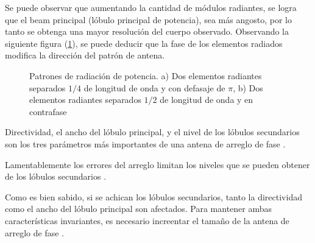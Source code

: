 Se puede observar que aumentando la cantidad de módulos radiantes, se logra que el beam principal (lóbulo principal de 
potencia), sea más angosto, por lo tanto se obtenga una mayor resolución del cuerpo observado. Observando la siguiente 
figura (\ref{fig:directArrayPat}), se puede deducir que la fase de los elementos radiados modifica la dirección del 
patrón de antena.

\begin{figure}[H]
	\centering
	\caption{Patrones de radiación de potencia. a) Dos elementos radiantes separados $1/4$ de longitud de onda y con 
		defasaje de $\pi$, b) Dos elementos radiantes separados $1/2$ de longitud de onda y en contrafase}
	\label{fig:directArrayPat}
\end{figure}

Directividad, el ancho del lóbulo principal, y el nivel de los lóbulos secundarios son los tres parámetros más importantes 
de una antena de arreglo de fase \cite{Hsiao1985}.

Lamentablemente los errores del arreglo limitan los niveles que se pueden obtener de los lóbulos secundarios \cite{Hsiao1985}.

Como es bien sabido, si se achican los lóbulos secundarios, tanto la directividad como el ancho del lóbulo principal son
afectados. Para mantener ambas características invariantes, es necesario increentar el tamaño de la antena de arreglo de 
fase \cite{Hsiao1985}.

